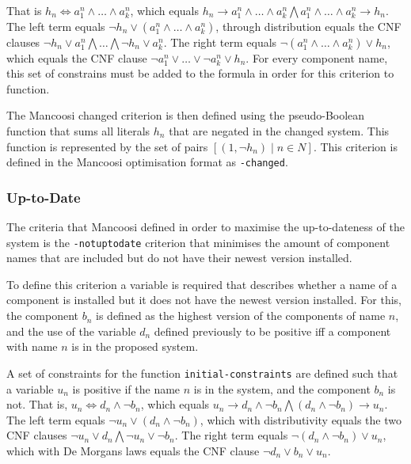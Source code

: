 That is $h_n \Leftrightarrow a^n_1 \wedge \ldots \wedge a^n_k$, 
which equals $h_n \rightarrow a^n_1 \wedge \ldots \wedge a^n_k \bigwedge a^n_1 \wedge \ldots \wedge a^n_k \rightarrow h_n$.
The left term equals $\neg h_n  \vee (a^n_1 \wedge \ldots \wedge a^n_k)$,
through distribution equals the CNF clauses $\neg h_n \vee a^n_1 \bigwedge \ldots \bigwedge \neg h_n \vee a^n_k$.
The right term equals $\neg(a^n_1 \wedge \ldots \wedge a^n_k) \vee h_n$,
which equals the CNF clause $\neg a^n_1 \vee \ldots \vee \neg a^n_k \vee h_n$.
For every component name, this set of constrains must be added to the formula in order for this criterion to function.

\begin{defs}
The Mancoosi changed criterion is then defined using the pseudo-Boolean function
that sums all literals $h_n$ that are negated in the changed system. 
This function is represented by the set of pairs $[(1,\neg h_n) \mid n \in N]$.
This criterion is defined in the Mancoosi optimisation format as \verb+-changed+.
\end{defs}

\subsubsection{Up-to-Date}
The criteria that Mancoosi defined in order to maximise the up-to-dateness of the system is the \verb+-notuptodate+ 
criterion that minimises the amount of component names that are included but do not have their newest version installed.

To define this criterion a variable is required that describes whether a name of a component is installed but it does not have the newest version installed.
For this, the component $b_n$ is defined as the highest version of the components of name $n$,
and the use of the variable $d_n$ defined previously to be positive iff a component with name $n$ is in the proposed system.

A set of constraints for the function \verb+initial-constraints+ are defined
such that a variable $u_n$ is positive if the name $n$ is in the system, and the component $b_n$ is not.
That is, $u_n \Leftrightarrow d_n \wedge \neg b_n$, which equals
$u_n \rightarrow d_n \wedge \neg b_n \bigwedge (d_n \wedge \neg b_n) \rightarrow u_n$.
The left term equals $\neg u_n \vee (d_n \wedge \neg b_n)$, 
which with distributivity equals the two CNF clauses $\neg u_n \vee d_n \bigwedge \neg u_n \vee \neg b_n$.
The right term equals $\neg (d_n \wedge \neg b_n) \vee u_n$,
which with De Morgans laws equals the CNF clause $\neg d_n \vee b_n \vee u_n$. 

